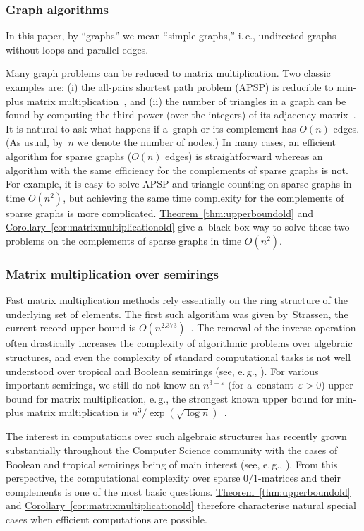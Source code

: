 \documentclass[11pt]{article}
\numberwithin{equation}{section}
\theoremstyle{definition}
\theoremstyle{plain}
\newcommand{\ie}{i.\,e.}
\newcommand{\eg}{e.\,g.}
\newcommand{\expref}[2]{\hyperref[#2]{#1~\ref{#2}}}
\theoremstyle{plain}\newtheorem{observation}[theorem]{Observation}
\begin{document}
\subsubsection{Graph algorithms}
%
%
%
%
In this paper, by ``graphs'' we mean ``simple graphs,'' \ie,
undirected graphs without loops and parallel edges.

Many graph problems can be reduced to matrix multiplication.
Two classic examples are: (i) the all-pairs shortest path problem (APSP) is
reducible to min-plus matrix multiplication~\cite{DBLP:conf/focs/FischerM71},
and (ii) the number of triangles in %
a %
graph can be found by
computing the third power (over the integers) of its adjacency
matrix~\cite{Itai_Rodeh_siam,Williams2009TriangleDV}.
It is natural to ask what happens if a~graph
or its complement %
%
has $O(n)$ edges.  %
%
(As usual, by~$n$ we denote the number of nodes.)
In many cases, an efficient algorithm
for sparse graphs ($O(n)$ edges) is straightforward
whereas an algorithm with the same efficiency for
the %
complements of sparse graphs
%
%
%
%
is not. For
example, it is easy to solve APSP and triangle counting on sparse graphs in
time $O(n^2)$, but achieving the same time complexity for
the %
complements of sparse
graphs is more complicated.
\expref{Theorem}{thm:upperboundold} and \expref{Corollary}{cor:matrixmultiplicationold} give
a~black-box way to solve these two problems on
the %
complements of sparse graphs in
time $O(n^2)$.

\subsubsection{Matrix multiplication over semirings}  Fast matrix
multiplication methods rely essentially on the ring structure of the underlying
set of elements. The first such algorithm was given by~Strassen,
the current record upper bound is
$O(n^{2.373})$~\cite{DBLP:conf/stoc/Williams12, DBLP:conf/issac/Gall14a}.
The removal of the inverse operation often drastically increases the complexity
of algorithmic problems over algebraic structures, and even the complexity of
standard computational tasks %
is  %
not well understood over tropical and
Boolean semirings (see, \eg, \cite{Williams14,GrigorievP15}).
For various important semirings,
we still do not know an $n^{3-\varepsilon}$ (for a~constant~$\varepsilon>0$)
upper bound for matrix multiplication, \eg, the strongest known upper bound for
min-plus matrix multiplication is $n^3/\exp(\sqrt{\log n})$~\cite{Williams14}.

The interest in computations over such algebraic structures has
recently %
grown  %
substantially throughout the Computer Science community
%
%
%
with the cases of Boolean and
tropical semirings being of main interest (see,
\eg, \cite{Jukna16,Williams14,butkovic10systems}).
From this perspective, the %
computational %
complexity over %
sparse $0/1$-matrices and their complements %
is one of the most basic questions.
\expref{Theorem}{thm:upperboundold} and \expref{Corollary}{cor:matrixmultiplicationold}
therefore characterise natural special
cases when efficient computations are possible.
\end{document}
